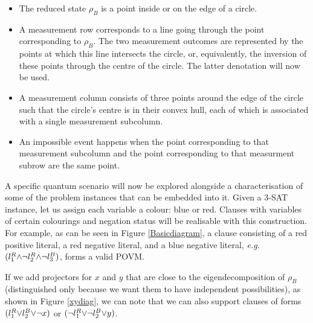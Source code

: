 \documentclass[reprint]{revtex4-1}
\theoremstyle{definition}
\begin{document}
\begin{itemize}
\item The reduced state $\rho_B$ is a point inside or on the edge of a circle.

\item A measurement row corresponds to a line going through the point corresponding to $\rho_B$. The two measurement outcomes are represented by the points at which this line intersects the circle, or, equivalently, the inversion of these points through the centre of the circle. The latter denotation will now be used.

\item A measurement column consists of three points around the edge of the circle such that the circle's centre is in their convex hull, each of which is associated with a single measurement subcolumn.

\item An impossible event happens when the point corresponding to that measurement subcolumn and the point corresponding to that measurment subrow are the same point. %
\end{itemize}

A specific quantum scenario will now be explored alongside a characterisation of some of the problem instances that can be embedded into it. Given a \textsc{3-SAT} instance, let us assign each variable a colour: blue or red. Clauses with variables of certain colourings and negation status will be realisable with this construction. For example, as can be seen in Figure \ref{Basicdiagram}, a clause consisting of a red positive literal, a red negative literal, and a blue negative literal, \emph{e.g.} $(l_1^R \color{black}{\wedge} \neg l_2^R \color{black}{\wedge} \neg l_3^B)$, forms a valid POVM. 

If we add projectors for $x$ and $y$ that are close to the eigendecomposition of $\rho_B$ (distinguished only because we want them to have independent possibilities), as shown in Figure \ref{xydiag}, we can note that we can also support clauses of forms $(l_1^R \color{black}{\vee}  l_2^B \color{black}{\vee} \neg x)$ or $(\neg l_1^R \color{black}{\vee} \neg l_2^B \color{black}{\vee} y)$.
\end{document}
